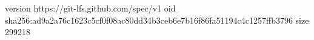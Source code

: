 version https://git-lfs.github.com/spec/v1
oid sha256:ad9a2a76c1623c5cf0f08ac80dd34b3ceb6e7b16f86fa51194c4c1257ffb3796
size 299218
